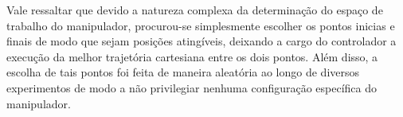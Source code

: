 Vale ressaltar que devido a natureza complexa da determinação do espaço 
de trabalho do manipulador, procurou-se simplesmente escolher 
os pontos inicias e finais de modo que sejam posições atingíveis, deixando a 
cargo do controlador a execução da melhor trajetória cartesiana entre os dois pontos.
Além disso, a escolha de tais pontos foi feita de maneira aleatória ao longo de diversos experimentos
de modo a não privilegiar nenhuma configuração específica do manipulador.